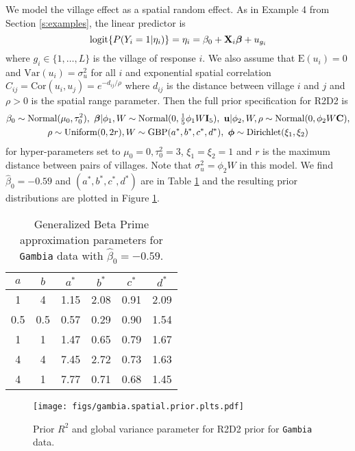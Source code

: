 \documentclass[12pt]{article}
\begin{document}
We model the village effect as a spatial random effect. As in Example 4 from Section \ref{s:examples}, the linear predictor is
\begin{equation}
    \mbox{logit}\{P(Y_i=1|\eta_i)\} = \eta_i = \beta_0 + \mbox{\bf X}_i\mbox{\boldmath $\beta$} +u_{g_i}
\end{equation}
where $g_i\in\{1,\dots,L\}$ is the village of response $i$. We also assume that $\mbox{E}(u_i)=0$ and $\mbox{Var}(u_i)=\sigma^2_u$ for all $i$ and exponential spatial correlation $C_{ij}=\mbox{Cor}(u_i,u_j) = e^{-d_{ij}/\rho}$ where $d_{ij}$ is the distance between village $i$ and $j$ and $\rho>0$ is the spatial range parameter. Then the full prior specification for R2D2 is
\begin{multline}
       \beta_0\sim\mbox{Normal}(\mu_0,\tau_0^2),\
       \bbeta|\phi_1,W\sim\mbox{Normal}(0, \tfrac15\phi_1W\bI_5),\
       {\bf u}|\phi_2,W,\rho\sim\mbox{Normal}(0,\phi_2 W\bC),\\ \rho\sim\mbox{Uniform}(0, 2r), W\sim\mbox{GBP}(a^*, b^*, c^*, d^*),\ \bphi\sim\mbox{Dirichlet}(\xi_1,\xi_2)
\end{multline}
for hyper-parameters set to $\mu_0=0,\tau_0^2=3$, $\xi_1=\xi_2=1$ and $r$ is the maximum distance between pairs of villages. Note that $\sigma^2_u=\phi_2W$ in this model.  We find $\hat\beta_0=-0.59$ and $(a^*,b^*,c^*,d^*)$ are in Table \ref{tab:abcd} and the resulting prior distributions are plotted in Figure \ref{fig:gamb.rand.prior}.

\begin{table}
    \centering
    \begin{tabular}{cc|cccc}
         $a$& $b$ & $a^*$&$b^*$&$c^*$&$d^*$  \\\hline
         1 & 4&1.15& 2.08& 0.91& 2.09\\
         0.5 & 0.5 &0.57 &0.29& 0.90& 1.54\\
         1 & 1&1.47& 0.65& 0.79& 1.67\\
         4 & 4&7.45& 2.72& 0.73& 1.63\\
         4 & 1&7.77& 0.71& 0.68 &1.45
    \end{tabular}
    \caption{Generalized Beta Prime approximation parameters  for {\tt Gambia} data with $\hat\beta_0=-0.59$.}
    \label{tab:abcd}
\end{table}

\begin{figure}
    \centering
    \texttt{[image: figs/gambia.spatial.prior.plts.pdf]}
    \caption{Prior $R^2$ and global variance parameter for R2D2 prior for {\tt Gambia} data.}
    \label{fig:gamb.rand.prior}
\end{figure}
\end{document}
